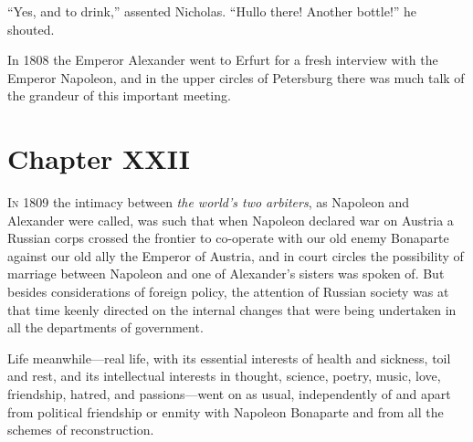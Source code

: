 ``Yes, and to drink,'' assented Nicholas. ``Hullo there! Another
bottle!''  he shouted.

In 1808 the Emperor Alexander went to Erfurt for a fresh
interview with the Emperor Napoleon, and in the upper circles of
Petersburg there was much talk of the grandeur of this important
meeting.


\chapter*{Chapter XXII}
\ifaudio
{} 
\fi

\lettrine[lines=2, loversize=0.3, lraise=0]{\initfamily I}{n}
1809 the intimacy between \emph{the world's two arbiters}, as
Napoleon and Alexander were called, was such that when Napoleon
declared war on Austria a Russian corps crossed the frontier to
co-operate with our old enemy Bonaparte against our old ally the
Emperor of Austria, and in court circles the possibility of
marriage between Napoleon and one of Alexander's sisters was
spoken of. But besides considerations of foreign policy, the
attention of Russian society was at that time keenly directed on
the internal changes that were being undertaken in all the
departments of government.

Life meanwhile---real life, with its essential interests of
health and sickness, toil and rest, and its intellectual
interests in thought, science, poetry, music, love, friendship,
hatred, and passions---went on as usual, independently of and
apart from political friendship or enmity with Napoleon Bonaparte
and from all the schemes of reconstruction.